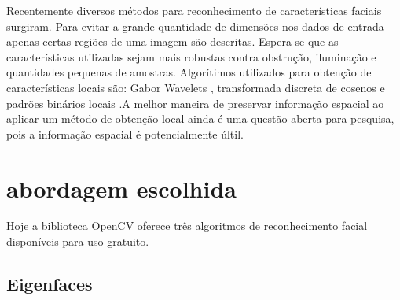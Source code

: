 Recentemente diversos métodos para reconhecimento de características faciais surgiram. Para evitar a grande quantidade de dimensões nos dados de entrada apenas certas regiões de uma imagem são descritas. Espera-se que as características utilizadas sejam mais robustas contra obstrução, iluminação e quantidades pequenas de amostras. Algorítimos utilizados para obtenção de características locais são: Gabor Wavelets \cite{wiskott1997face}, transformada discreta de cosenos \cite{messer2006performance} e padrões binários locais \cite{binaryface}.A melhor maneira de preservar informação espacial ao aplicar um método de obtenção local ainda é uma questão aberta para pesquisa, pois a informação espacial é potencialmente últil.

\section*{abordagem escolhida}

Hoje a biblioteca OpenCV oferece três algoritmos de reconhecimento facial disponíveis para uso gratuito. 
\subsection*{Eigenfaces} %
\label{sub:eigenfaces}

